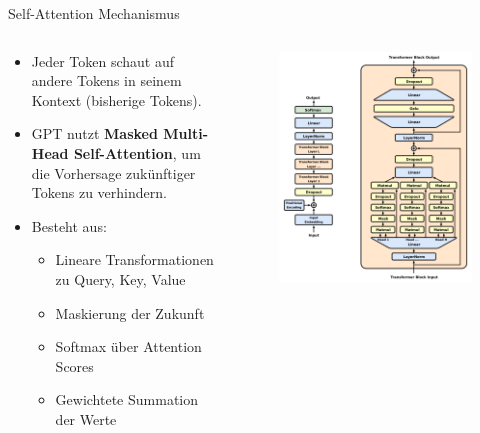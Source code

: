 \documentclass[aspectratio=1610, xcolor=dvipsnames, 9pt]{beamer}
\begin{document}
\begin{frame}{Self-Attention Mechanismus}
  \begin{columns}
    \begin{column}{0.5\textwidth}
      \begin{itemize}
        \item Jeder Token schaut auf andere Tokens in seinem Kontext (bisherige Tokens).
        \item GPT nutzt \textbf{Masked Multi-Head Self-Attention}, um die Vorhersage zukünftiger Tokens zu verhindern.
        \item Besteht aus:
          \begin{itemize}
            \item Lineare Transformationen zu Query, Key, Value
            \item Maskierung der Zukunft
            \item Softmax über Attention Scores
            \item Gewichtete Summation der Werte
          \end{itemize}
      \end{itemize}
    \end{column}
    \begin{column}{0.5\textwidth}
      \begin{figure}
        \centering
        \includegraphics[width=0.8\columnwidth]{images/Full_GPT_architecture.png}
      \end{figure}
    \end{column}
  \end{columns}
\end{frame}
\end{document}
